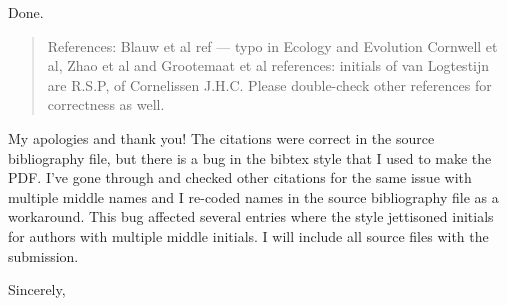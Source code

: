 \documentclass[letterpaper, 12pt]{letter}
\begin{document}
\begin{letter}{}
Done.

\begin{quote}
References: Blauw et al ref --- typo in Ecology and Evolution
Cornwell et al, Zhao et al and Grootemaat et al references: initials of van Logtestijn are R.S.P, of Cornelissen J.H.C. Please double-check other references for correctness as well.
\end{quote}

My apologies and thank you! The citations were correct in the source bibliography file, but there is a bug in the bibtex style that I used to make the PDF. I've gone through and checked other citations for the same issue with multiple middle names and I re-coded names in the source bibliography file as a workaround. This bug affected several entries where the style jettisoned initials for authors with multiple middle initials. I will include all source files with the submission.


\closing{Sincerely,}

\end{letter}
\end{document}
